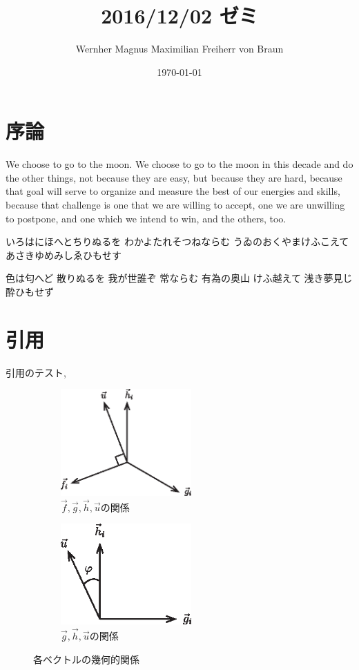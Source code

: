 \documentclass[a4paper,uplatex,dvipdfmx,ja=standard,11pt]{bxjsarticle}
\title{2016/12/02 ゼミ}
\author{Wernher Magnus Maximilian Freiherr von Braun}
\date{\today}
\begin{document}
	\maketitle
	
	\section{序論}
	We choose to go to the moon. We choose to go to the moon in this decade and do the other things, not because they are easy, but because they are hard, because that goal will serve to organize and measure the best of our energies and skills, because that challenge is one that we are willing to accept, one we are unwilling to postpone, and one which we intend to win, and the others, too.
	
	
	いろはにほへとちりぬるを
	わかよたれそつねならむ
	うゐのおくやまけふこえて
	あさきゆめみしゑひもせす
	
	色は匂へど 散りぬるを
	我が世誰ぞ 常ならむ
	有為の奥山 けふ越えて
	浅き夢見じ 酔ひもせず
	
	
	\section{引用}
	引用のテスト\cite{Stevenson2012,Tsukahara2016},\cite{konoue2005,schaubtext,yatsu2014pre}
\begin{figure}[h]
	\begin{subfigure}{0.5\linewidth}
		\centering\includegraphics[width=5cm]{fig/fig1.eps}
		\caption{$\vec{f},\vec{g},\vec{h},\vec{u}$の関係}\label{fig:fig1}    %
	\end{subfigure}
	\begin{subfigure}{0.5\linewidth}
		\centering\includegraphics[width=5cm]{fig/fig2.eps}
		\caption{$\vec{g},\vec{h},\vec{u}$の関係}\label{fig:fig2}    %
	\end{subfigure}
	\caption{各ベクトルの幾何的関係}\label{fig:case4} 
\end{figure}


\end{document}
